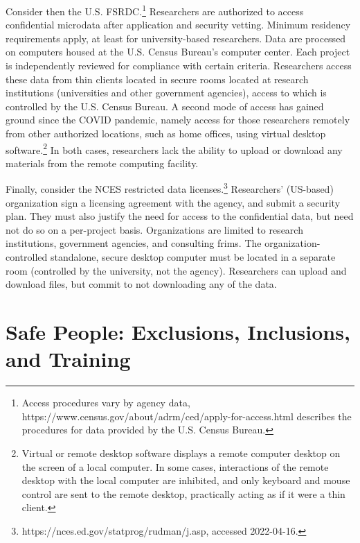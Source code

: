 Consider then the U.S. \ac{FSRDC}.\footnote{Access procedures vary by agency data, https://www.census.gov/about/adrm/ced/apply-for-access.html describes the procedures for data provided by the U.S. Census Bureau.} Researchers are authorized to access confidential microdata after application and security vetting. Minimum residency requirements apply, at least for university-based researchers. Data are processed on computers housed at the U.S. Census Bureau's computer center. Each project is independently reviewed for compliance with certain criteria. Researchers access these data from thin clients located in secure rooms located at research institutions (universities and other government agencies), access to which is controlled by the U.S. Census Bureau. A second mode of access has gained ground since the COVID pandemic, namely access for those researchers remotely from other authorized locations, such as home offices, using virtual desktop software.\footnote{Virtual or remote desktop software displays a remote computer desktop on the screen of a local computer. In some cases, interactions of the remote desktop with the local computer are inhibited, and only keyboard and mouse control are sent to the remote desktop, practically acting as if it were a thin client.} In both cases, researchers lack the ability to upload or download any materials from the remote computing facility. 

Finally, consider the \ac{NCES} restricted data licenses.\footnote{https://nces.ed.gov/statprog/rudman/j.asp, accessed 2022-04-16.} Researchers' (US-based) organization sign a licensing agreement with the agency, and submit a security plan. They must also justify the need for access to the confidential data, but need not do so on a per-project basis. Organizations are limited to research institutions, government agencies, and consulting frims. The organization-controlled standalone, secure desktop computer must be located in a separate room (controlled by the university, not the agency). Researchers can upload and download files, but commit to not downloading any of the data. 

\section{Safe People: Exclusions, Inclusions, and Training}

